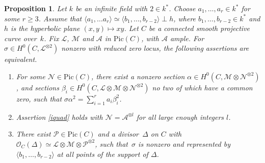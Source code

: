 \documentclass{amsart}
\newtheorem{prop}[thm]{Proposition}
\theoremstyle{definition}
\theoremstyle{remark}
\numberwithin{equation}{section}
\newcommand{\Pic}{\mathrm{Pic}}
\def\cA{\mathcal{A}}
\def\cN{\mathcal{N}}
\def\cM{\mathcal{M}}
\def\cL{\mathcal{L}}
\def\cO{\mathcal{O}}
\def\cM{\mathcal{M}}
\def\cP{\mathcal{P}}
\begin{document}
\begin{prop}
\label{condition2prop}
Let $k$ be an infinite field with $2\in k^*$.
Choose ${a_1,\dots,a_r\in k^*}$ for some $r\geq 3$. Assume that $\langle a_1,\dots a_r\rangle\simeq \langle b_1,\dots, b_{r-2}\rangle\perp h$, where ${b_1,\dots, b_{r-2}\in k^*}$ 
and $h$ is the hyperbolic plane $(x,y)\mapsto xy$.
Let $C$ be a connected smooth projective curve over~$k$. Fix $\cL$, $\cM$ and $\cA$ in $\Pic(C)$, with $\cA$ ample. For~${\sigma\in H^0(C,\cL^{\otimes 2})}$ nonzero with reduced zero locus, the following assertions are \mbox{equivalent}.
\begin{enumerate}[label=(\roman*)] 
\item
\label{iquad}
For some $\cN\in\Pic(C)$, there exist a nonzero section $\alpha\in H^0(C,\cM\otimes\cN^{\otimes 2})$, and sections $\beta_{i}\in H^0(C,\cL\otimes\cM\otimes\cN^{\otimes 2})$ no two of which have a common zero, such that
$\sigma\alpha^2=\sum_{i=1}^ra_i\beta_{i}^2$.
 \item
 \label{iiquad}
 Assertion \ref{iquad} holds with $\cN=\cA^{\otimes l}$ for all large enough integers $l$.
 \item
 \label{iiiquad}
 There exist $\cP\in\Pic(C)$ and a divisor~$\Delta$ on $C$ with $\cO_C(\Delta)\simeq\cL\otimes\cM\otimes\cP^{\otimes 2}$, such that~$\sigma$ is nonzero and represented by $\langle b_1,\dots, b_{r-2}\rangle$ at all points of the support of $\Delta$. 
\end{enumerate}
\end{prop}
\end{document}
